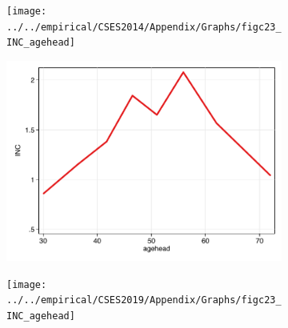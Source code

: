 \documentclass[11pt,letterpaper]{article}
\begin{document}
\begin{figure}
			\begin{subfigure}{.33\textwidth}
				\centering
				\texttt{[image: ../../empirical/CSES2014/Appendix/Graphs/figc23\_INC\_agehead]} 
				\vspace{-2.5em}
				\newline {}
			\end{subfigure}
			\begin{subfigure}{.33\textwidth}
				\centering
				\includegraphics[width=1\linewidth]{../../empirical/CSES2017/Appendix/Graphs/figc23_INC_agehead} 
				\vspace{-2.5em}
				\newline {}
			\end{subfigure}
			\begin{subfigure}{.33\textwidth}
				\centering
				\texttt{[image: ../../empirical/CSES2019/Appendix/Graphs/figc23\_INC\_agehead]} 
				\vspace{-2.5em}
				\newline {}
			\end{subfigure}
			
			\vspace{0em}
			\newline
			

\end{figure}
\end{document}
